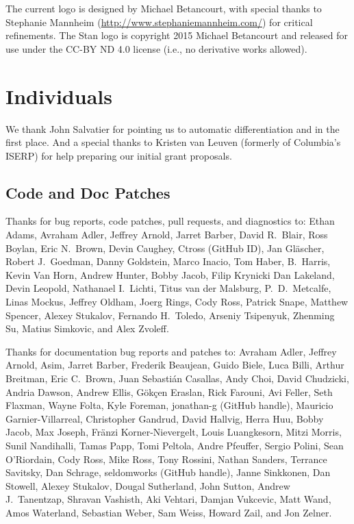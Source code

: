 The current logo is designed by Michael Betancourt, with special
thanks to Stephanie Mannheim (\url{http://www.stephaniemannheim.com/})
for critical refinements.  The Stan logo is copyright 2015 Michael
Betancourt and released for use under the CC-BY ND 4.0 license (i.e.,
no derivative works allowed).


\section*{Individuals}

We thank John Salvatier for pointing us to automatic differentiation
and \HMC in the first place.  And a special thanks to Kristen van
Leuven (formerly of Columbia's ISERP) for help preparing our initial
grant proposals.

\subsection*{Code  and Doc Patches}

Thanks for bug reports, code patches, pull requests, and diagnostics
to:
Ethan Adams,
Avraham Adler,
Jeffrey Arnold,
Jarret Barber,
David R.~Blair,
Ross Boylan,
Eric N.~Brown,
Devin Caughey,
Ctross (GitHub ID),
Jan Gl\"ascher,
Robert J.\ Goedman,
Danny Goldstein,
Marco Inacio, 
Tom Haber,
B.~Harris,
Kevin Van Horn,
Andrew Hunter,
Bobby Jacob,
Filip Krynicki
Dan Lakeland,
Devin Leopold,
Nathanael I.~Lichti,
Titus van der Malsburg,
P.~D.~Metcalfe,
Linas Mockus,
Jeffrey Oldham,
Joerg Rings,
Cody Ross,
Patrick Snape,
Matthew Spencer,
Alexey Stukalov,
Fernando H.~Toledo,
Arseniy Tsipenyuk,
Zhenming Su,
Matius Simkovic, and
Alex Zvoleff.

Thanks for documentation bug reports and patches to:
Avraham Adler,
Jeffrey Arnold,
Asim,
Jarret Barber,
Frederik Beaujean,
Guido Biele,
Luca Billi,
Arthur Breitman,
Eric C.~Brown,
Juan Sebasti\'an Casallas,
Andy Choi,
David Chudzicki,
Andria Dawson,
Andrew Ellis,
G\"{o}k\c{c}en Eraslan,
Rick Farouni,
Avi Feller,
Seth Flaxman,
Wayne Folta,
Kyle Foreman,
jonathan-g (GitHub handle),
Mauricio Garnier-Villarreal,
Christopher Gandrud,
David Hallvig,
Herra Huu,
Bobby Jacob,
Max Joseph,
Fr\"anzi Korner-Nievergelt,
Louis Luangkesorn,
Mitzi Morris,
Sunil Nandihalli,
Tamas Papp,
Tomi Peltola,
Andre Pfeuffer,
Sergio Polini,
Sean O'Riordain,
Cody Ross,
Mike Ross,
Tony Rossini,
Nathan Sanders,
Terrance Savitsky,
Dan Schrage,
seldomworks (GitHub handle),
Janne Sinkkonen,
Dan Stowell,
Alexey Stukalov,
Dougal Sutherland,
John Sutton,
Andrew J.~Tanentzap,
Shravan Vashisth,
Aki Vehtari,
Damjan Vukcevic,
Matt Wand,
Amos Waterland,
Sebastian Weber,
Sam Weiss,
Howard Zail, and
Jon Zelner.

